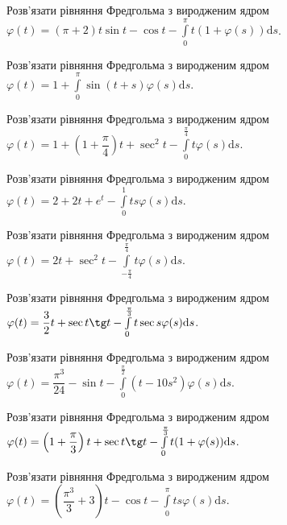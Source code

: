 \documentclass[12pt]{extarticle}
\begin{document}
\begin{Exercise}
Розв’язати рівняння Фредгольма з виродженим ядром $\varphi(t) = (\pi + 2) t \sin t - \cos t - \int\limits_{0}^{\pi} t (1+\varphi(s)) \mathrm{d}s$.
\end{Exercise}

\begin{Exercise}
Розв’язати рівняння Фредгольма з виродженим ядром $\varphi(t) = 1 + \int\limits_{0}^{\pi} \sin(t+s) \varphi(s) \mathrm{d}s$.
\end{Exercise}

\begin{Exercise}
Розв’язати рівняння Фредгольма з виродженим ядром $\varphi(t) = 1 + \left(1 + \dfrac{\pi}{4}\right) t + \sec^2 t - \int\limits_{0}^{\frac{\pi}{4}} t \varphi(s) \mathrm{d}s$.
\end{Exercise}

\begin{Exercise}
Розв’язати рівняння Фредгольма з виродженим ядром $\varphi(t) = 2 + 2t + e^t - \int\limits_{0}^{1} ts \varphi(s) \mathrm{d}s$.
\end{Exercise}

\begin{Exercise}
Розв’язати рівняння Фредгольма з виродженим ядром $\varphi(t) = 2t + \sec^2 t - \int\limits_{-\frac{\pi}{4}}^{\frac{\pi}{4}} t \varphi(s) \mathrm{d}s$.
\end{Exercise}

\begin{Exercise}
Розв’язати рівняння Фредгольма з виродженим ядром $\varphi(t) = \dfrac{3}{2}t + \sec t \tg t - \int\limits_{0}^{\frac{\pi}{3}} t \sec s \varphi(s) \mathrm{d}s$.
\end{Exercise}

\begin{Exercise}
Розв’язати рівняння Фредгольма з виродженим ядром $\varphi(t) = \dfrac{\pi^3}{24} - \sin t - \int\limits_{0}^{\frac{\pi}{2}} (t-10s^2) \varphi(s) \mathrm{d}s$.
\end{Exercise}

\begin{Exercise}
Розв’язати рівняння Фредгольма з виродженим ядром $\varphi(t) = \left(1+ \dfrac{\pi}{3}\right) t + \sec t \tg t - \int\limits_{0}^{\frac{\pi}{3}} t (1 + \varphi(s)) \mathrm{d}s$.
\end{Exercise}

\begin{Exercise}
Розв’язати рівняння Фредгольма з виродженим ядром $\varphi(t) = \left(\dfrac{\pi^3}{3} + 3\right)t - \cos t - \int\limits_{0}^{\pi} ts \varphi(s) \mathrm{d}s$.
\end{Exercise}
\end{document}
